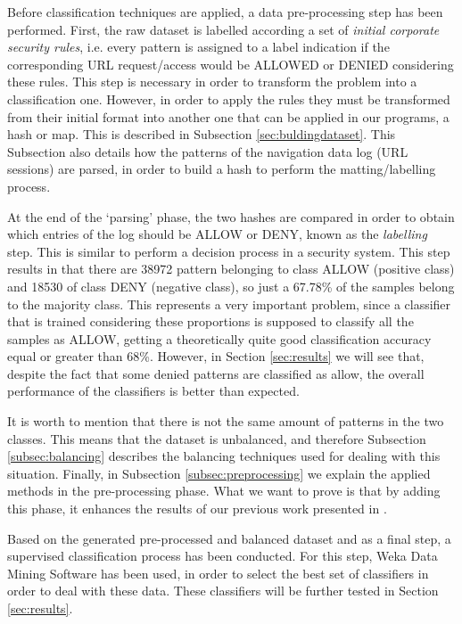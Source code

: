\documentclass{llncs}
\begin{document}
\noindent Before classification techniques are applied, a data
pre-processing step has been performed. First, the raw dataset is
labelled according a set of \textit{initial corporate security rules},
i.e. every pattern is assigned to a label indication if the
corresponding URL request/access would be ALLOWED or DENIED
considering these rules. This step is necessary in order to transform
the problem into a classification one. However, in order to apply the
rules they must be transformed from their initial format into another
one that can be applied in our programs, a hash or map. This is
described in Subsection
\ref{sec:buldingdataset}. This Subsection also details how the
patterns of the navigation data log (URL sessions) are parsed, in
order to build a hash to perform the matting/labelling process.

At the end of the `parsing' phase, the two hashes are compared in order to obtain which entries of the log should be ALLOW or DENY, known as the \textit{labelling} step. This is similar to perform a decision process in a security system. This step results in that there are 38972 pattern belonging to class ALLOW (positive class) and 18530 of class DENY (negative class), so just a 67.78\% of the samples belong to the majority class. This represents a very important problem, since a classifier that is trained considering these proportions is supposed to classify all the samples as ALLOW, getting a theoretically quite good classification accuracy equal or greater than 68\%. However, in Section \ref{sec:results} we will see that, despite the fact that some denied patterns are classified as allow, the overall performance of the classifiers is better than expected.

It is worth to mention that there is not the same amount of patterns in the two classes. This means that the dataset is unbalanced, and therefore Subsection \ref{subsec:balancing} describes the balancing techniques used for dealing with this situation. Finally, in Subsection \ref{subsec:preprocessing} we explain the applied methods in the pre-processing phase. What we want to prove is that by adding this phase, it enhances the results of our previous work presented in \cite{ECTA}.

Based on the generated pre-processed and balanced dataset and as a final step, a supervised classification process \cite{classification_67} has been conducted. For this step, Weka Data Mining Software\cite{weka:site} has been used, in order to select the best set of classifiers in order to deal with these data. These classifiers will be further tested in Section \ref{sec:results}.
\end{document}
